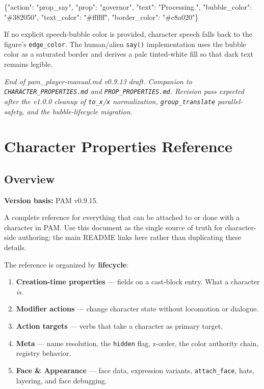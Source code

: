 \documentclass[
  11pt,
]{book}
\newenvironment{Shaded}{}{}
\newcommand{\DataTypeTok}[1]{\textcolor[rgb]{0.56,0.13,0.00}{#1}}
\newcommand{\FunctionTok}[1]{\textcolor[rgb]{0.02,0.16,0.49}{#1}}
\newcommand{\StringTok}[1]{\textcolor[rgb]{0.25,0.44,0.63}{#1}}
\providecommand{\tightlist}{%
  \setlength{\itemsep}{0pt}\setlength{\parskip}{0pt}}
\begin{document}
\begin{Shaded}
\begin{Highlighting}[]
\FunctionTok{\{}\DataTypeTok{"action"}\FunctionTok{:} \StringTok{"prop\_say"}\FunctionTok{,} \DataTypeTok{"prop"}\FunctionTok{:} \StringTok{"governor"}\FunctionTok{,}
 \DataTypeTok{"text"}\FunctionTok{:} \StringTok{"Processing."}\FunctionTok{,}
 \DataTypeTok{"bubble\_color"}\FunctionTok{:} \StringTok{"\#382050"}\FunctionTok{,}
 \DataTypeTok{"text\_color"}\FunctionTok{:} \StringTok{"\#ffffff"}\FunctionTok{,}
 \DataTypeTok{"border\_color"}\FunctionTok{:} \StringTok{"\#c8a020"}\FunctionTok{\}}
\end{Highlighting}
\end{Shaded}

If no explicit speech-bubble color is provided, character speech falls
back to the figure's \texttt{edge\_color}. The human/alien
\texttt{say()} implementation uses the bubble color as a saturated
border and derives a pale tinted-white fill so that dark text remains
legible.


\emph{End of pam\_player-manual.md v0.9.13 draft. Companion to
\texttt{CHARACTER\_PROPERTIES.md} and \texttt{PROP\_PROPERTIES.md}.
Revision pass expected after the v1.0.0 cleanup of
\texttt{to\_x}/\texttt{x} normalization, \texttt{group\_translate}
parallel-safety, and the bubble-lifecycle migration.}

\chapter{Character Properties
Reference}\label{character-properties-reference}

\section{Overview}\label{overview-1}

\textbf{Version basis:} PAM v0.9.15.

A complete reference for everything that can be attached to or done with
a character in PAM. Use this document as the single source of truth for
character-side authoring; the main README links here rather than
duplicating these details.

The reference is organized by \textbf{lifecycle}:

\begin{enumerate}
\def\labelenumi{\arabic{enumi}.}
\tightlist
\item
  \textbf{Creation-time properties} --- fields on a cast-block entry.
  What a character \emph{is}.
\item
  \textbf{Modifier actions} --- change character state without
  locomotion or dialogue.
\item
  \textbf{Action targets} --- verbs that take a character as primary
  target.
\item
  \textbf{Meta} --- name resolution, the \texttt{hidden} flag, z-order,
  the color authority chain, registry behavior.
\item
  \textbf{Face \& Appearance} --- face data, expression variants,
  \texttt{attach\_face}, hats, layering, and face debugging.
\end{enumerate}
\end{document}

